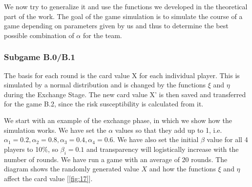 We now try to generalize it and use the functions we developed in the theoretical part of the work. The goal of the game simulation is to simulate the course of a game depending on parameters given by us and thus to determine the best possible combination of $\alpha$ for the team.

\subsubsection{Subgame B.0/B.1}
The basis for each round is the card value X for each individual player. This is simulated by a normal distribution and is changed by the functions $\xi$ and $\eta$ during the Exchange Stage. The new card value X' is then saved and transferred for the game B.2, since the risk susceptibility is calculated from it.

We start with an example of the exchange phase, in which we show how the simulation works. We have set the $\alpha$ values so that they add up to 1, i.e. $\alpha_1=0.2,\alpha_2=0.8,\alpha_3=0.4,\alpha_4=0.6$. We have also set the initial $\beta$ value for all 4 players to 10$\%$, so $\beta_i=0.1$ and transparency will logistically increase with the number of rounds. We have run a game with an average of 20 rounds. The diagram shows the randomly generated value $X$ and how the functions $\xi$ and $\eta$ affect the card value  [\ref{fig:17}].

